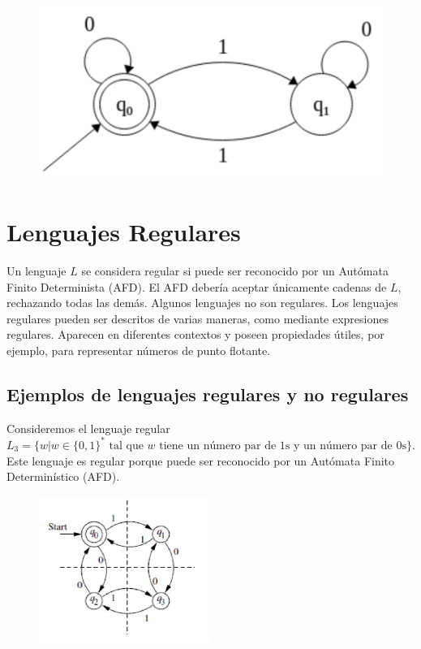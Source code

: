 \documentclass[11pt]{article}
\begin{document}
    \begin{figure}[H]
        \centering
        \includegraphics[width=\textwidth]{img/afd/afd-9}\label{fig:figure9}
    \end{figure}

    \newpage


    \section{Lenguajes Regulares}

    Un lenguaje $L$ se considera regular si puede ser reconocido por un Autómata Finito Determinista (AFD). El AFD debería aceptar únicamente cadenas de $L$, rechazando todas las demás. Algunos lenguajes no son regulares. Los lenguajes regulares pueden ser descritos de varias maneras, como mediante expresiones regulares. Aparecen en diferentes contextos y poseen propiedades útiles, por ejemplo, para representar números de punto flotante.

    \subsection{Ejemplos de lenguajes regulares y no regulares}

    Consideremos el lenguaje regular $L_3 = \{ w | w \in \{0,1\}^* \text{ tal que } w \text{ tiene un número par de 1s y un número par de 0s}\}$. Este lenguaje es regular porque puede ser reconocido por un Autómata Finito Determinístico (AFD).

    \begin{figure}[H]
        \centering
        \includegraphics[width=0.5\textwidth]{img/afd/afd-10}\label{fig:figure10}
    \end{figure}
\end{document}
